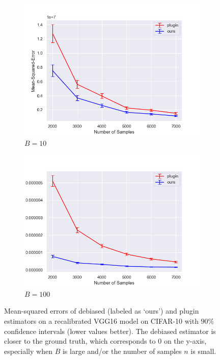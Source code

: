 \begin{figure}
  \centering
  \centering
     \begin{subfigure}[b]{0.48\textwidth}
         \centering
         \includegraphics[width=\textwidth]{images/mse_estimators_10_bins.png}
         \caption{$B = 10$
         }
         \label{fig:mse_estimators}
     \end{subfigure}
     \hfill
     \begin{subfigure}[b]{0.48\textwidth}
         \centering
         \includegraphics[width=\textwidth]{images/mse_estimator_100_bins.png}
         \caption{$B = 100$
         }
         \label{fig:ce_vs_bins_verifying}
     \end{subfigure}
  \caption{
    Mean-squared errors of debiased (labeled as `ours') and plugin estimators on a recalibrated VGG16 model on CIFAR-10 with $90\%$ confidence intervals (lower values better). The debiased estimator is closer to the ground truth, which corresponds to $0$ on the y-axis, especially when $B$ is large and/or the number of samples $n$ is small.
}
  \label{fig:mse_estimators_bins}
\end{figure}



